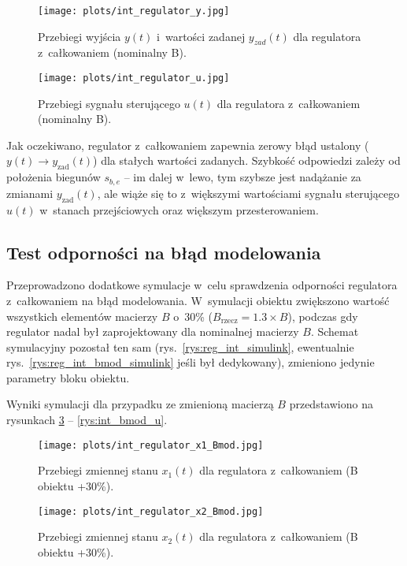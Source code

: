 \documentclass[a4paper,titlepage,11pt,floatssmall]{mwrep} %
\begin{document}
\begin{figure}[H]
    \centering
    \texttt{[image: plots/int\_regulator\_y.jpg]}
    \caption{Przebiegi wyjścia $y(t)$ i~wartości zadanej $y_{zad}(t)$ dla regulatora z~całkowaniem (nominalny B).}
    \label{rys:int_y}
\end{figure}

\begin{figure}[H]
    \centering
    \texttt{[image: plots/int\_regulator\_u.jpg]}
    \caption{Przebiegi sygnału sterującego $u(t)$ dla regulatora z~całkowaniem (nominalny B).}
    \label{rys:int_u}
\end{figure}

Jak oczekiwano, regulator z~całkowaniem zapewnia zerowy błąd ustalony ($y(t) \to y_{\text{zad}}(t)$) dla stałych wartości zadanych. Szybkość odpowiedzi zależy od położenia biegunów $s_{b,e}$ -- im dalej w~lewo, tym szybsze jest nadążanie za zmianami $y_{\text{zad}}(t)$, ale wiąże się to z~większymi wartościami sygnału sterującego $u(t)$ w~stanach przejściowych oraz większym przesterowaniem.

\FloatBarrier
\subsection*{Test odporności na błąd modelowania}

Przeprowadzono dodatkowe symulacje w~celu sprawdzenia odporności regulatora z~całkowaniem na błąd modelowania. W~symulacji obiektu zwiększono wartość wszystkich elementów macierzy $B$ o~30\% ($B_{\text{rzecz}} = 1.3 \times B$), podczas gdy regulator nadal był zaprojektowany dla nominalnej macierzy $B$. Schemat symulacyjny pozostał ten sam (rys.~\ref{rys:reg_int_simulink}, ewentualnie rys.~\ref{rys:reg_int_bmod_simulink} jeśli był dedykowany), zmieniono jedynie parametry bloku obiektu.

Wyniki symulacji dla przypadku ze zmienioną macierzą $B$ przedstawiono na rysunkach \ref{rys:int_bmod_x1} -- \ref{rys:int_bmod_u}.

\begin{figure}[H]
    \centering
    \texttt{[image: plots/int\_regulator\_x1\_Bmod.jpg]}
    \caption{Przebiegi zmiennej stanu $x_1(t)$ dla regulatora z~całkowaniem (B obiektu +30\%).}
    \label{rys:int_bmod_x1}
\end{figure}

\begin{figure}[H]
    \centering
    \texttt{[image: plots/int\_regulator\_x2\_Bmod.jpg]}
    \caption{Przebiegi zmiennej stanu $x_2(t)$ dla regulatora z~całkowaniem (B obiektu +30\%).}
    \label{rys:int_bmod_x2}
\end{figure}
\end{document}
